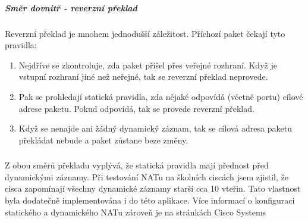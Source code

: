 


\subparagraph{Směr dovnitř - reverzní překlad}

Reverzní překlad je mnohem jednodušší záležitost. Příchozí paket čekají tyto pravidla:
\begin{enumerate}
  \item Nejdříve se zkontroluje, zda paket přišel přes veřejné rozhraní. Když je vstupní rozhraní jiné než neřejné, tak se reverzní překlad neprovede.

  \item Pak se prohledají statická pravidla, zda nějaké odpovídá (včetně portu) cílové adrese paketu. Pokud odpovídá, tak se provede reverzní překlad.

  \item Když se nenajde ani žádný dynamický záznam, tak se cílová adresa paketu překládat nebude a paket zůstane beze změny.
\end{enumerate}


\subsubsection*{}
Z obou směrů překladu vyplývá, že statická pravidla mají přednost před dynamickými záznamy. Při testování NATu na školních ciscách jsem zjistil, že cisca zapomínají všechny dynamické záznamy starší cca 10 vteřin. Tato vlastnost byla dodatečně implementována i do této aplikace. Více informací o konfiguraci statického a dynamického NATu zároveň je na stránkách Cisco Systems\cite{cisco:snat_dnat}









